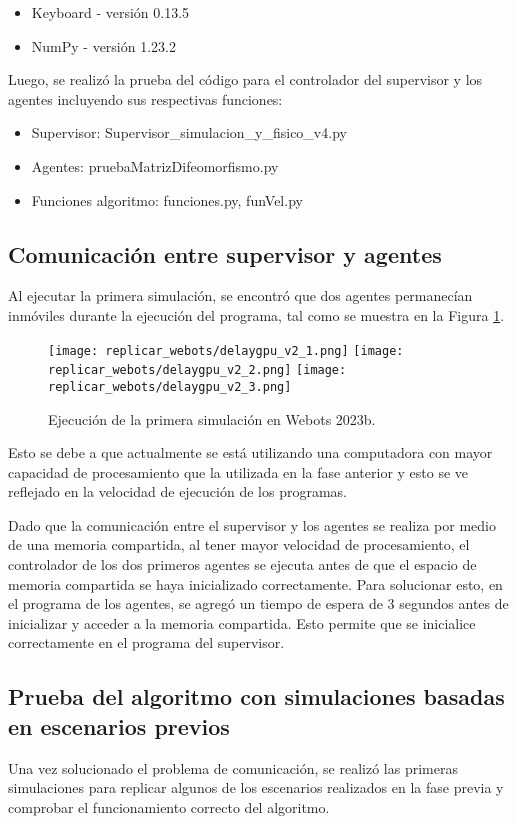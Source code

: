 \begin{itemize}
	\item Keyboard - versión 0.13.5
	\item NumPy - versión 1.23.2
\end{itemize}

Luego, se realizó la prueba del código para el controlador del supervisor y los agentes incluyendo sus respectivas funciones:
\begin{itemize}
	\item Supervisor: Supervisor\_simulacion\_y\_fisico\_v4.py
	\item Agentes: pruebaMatrizDifeomorfismo.py
	\item Funciones algoritmo: funciones.py, funVel.py
\end{itemize} 

\subsection{Comunicación entre supervisor y agentes}
Al ejecutar la primera simulación, se encontró que dos agentes permanecían inmóviles durante la ejecución del programa, tal como se muestra en la Figura \ref{fig:delaygpu}.

\begin{figure}[H]
	\centering
	\texttt{[image: replicar\_webots/delaygpu\_v2\_1.png]}
	\texttt{[image: replicar\_webots/delaygpu\_v2\_2.png]}
	\texttt{[image: replicar\_webots/delaygpu\_v2\_3.png]}
	\caption{Ejecución de la primera simulación en Webots 2023b.}
	\label{fig:delaygpu}
\end{figure}

Esto se debe a que actualmente se está utilizando una computadora con mayor capacidad de procesamiento que la utilizada en la fase anterior y esto se ve reflejado en la velocidad de ejecución de los programas. 

Dado que la comunicación entre el supervisor y los agentes se realiza por medio de una memoria compartida, al tener mayor velocidad de procesamiento, el controlador de los dos primeros agentes se ejecuta antes de que el espacio de memoria compartida se haya inicializado correctamente. Para solucionar esto, en el programa de los agentes, se agregó un tiempo de espera de 3 segundos antes de inicializar y acceder a la memoria compartida. Esto permite que se inicialice correctamente en el programa del supervisor.

\subsection{Prueba del algoritmo con simulaciones basadas en escenarios previos}
Una vez solucionado el problema de comunicación, se realizó las primeras simulaciones para replicar algunos de los escenarios realizados en la fase previa y comprobar el funcionamiento correcto del algoritmo. 

